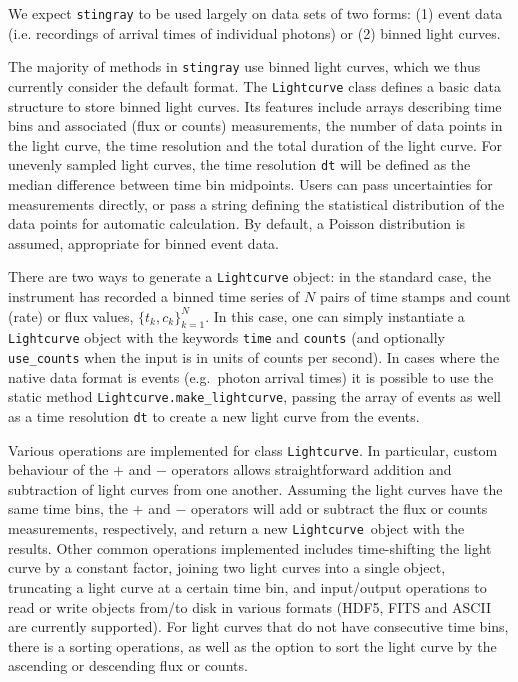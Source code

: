 \documentclass[12pt]{emulateapj}
\newcommand{\stingray}{\texttt{stingray}\xspace}
\newcommand{\lightcurve}{\texttt{Lightcurve}\xspace}
\begin{document}
We expect \stingray to be used largely on data sets of two forms: (1) event data (i.e. recordings of arrival times of individual photons) or (2) binned light curves. 

The majority of methods in \stingray use binned light curves, which we thus currently consider the default format. The \lightcurve class defines a basic data structure to store binned light curves. Its features include arrays describing time bins and associated (flux or counts) measurements, the number of data points in the light curve, the time resolution and the total duration of the light curve. For unevenly sampled light curves, the time resolution \texttt{dt} will be defined as the median difference between time bin midpoints. Users can pass uncertainties for measurements directly, or pass a string defining the statistical distribution of the data points for automatic calculation. By default, a Poisson distribution is assumed, appropriate for binned event data. 

There are two ways to generate a \texttt{Lightcurve} object: in the standard case, the instrument has recorded a binned time series of $N$ pairs of time stamps and count (rate) or flux values, $\{t_k, c_k \}_{k=1}^{N}$. In this case, one can simply instantiate a \texttt{Lightcurve} object with the keywords \texttt{time} and \texttt{counts} (and optionally \texttt{use\_counts} when the input is in units of counts per second). In cases where the native data format is events (e.g.\ photon arrival times) it is possible to use the static method \texttt{Lightcurve.make\_lightcurve}, passing the array of events as well as a time resolution \texttt{dt} to create a new light curve from the events.

Various operations are implemented for class \lightcurve. In particular, custom behaviour of the $+$ and $-$ operators allows straightforward addition and subtraction of light curves from one another. Assuming the light curves have the same time bins, the $+$ and $-$ operators will add or subtract the flux or counts measurements, respectively, and return a new \lightcurve\ object with the results. Other common operations implemented includes time-shifting the light curve by a constant factor, joining two light curves into a single object, truncating a light curve at a certain time bin, and input/output operations to read or write objects from/to disk in various formats (HDF5, FITS and ASCII are currently supported). For light curves that do not have consecutive time bins, there is a sorting operations, as well as the option to sort the light curve by the ascending or descending flux or counts. 
\end{document}
